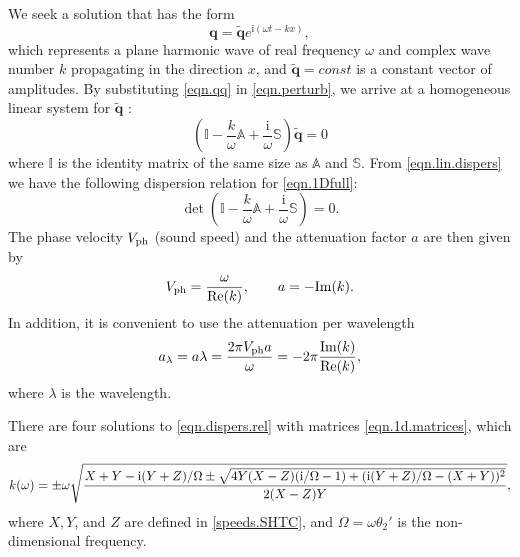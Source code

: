 \documentclass[3p,times,table]{article}
\newcommand{\qq}{{\bm{q}}}
\begin{document}
We seek a solution that has the form
\begin{equation}\label{eqn.qq}
\qq = \tilde{\qq} e^{\text{i}(\omega t - k x)},
\end{equation}
which represents a plane harmonic wave of real frequency $ \omega $ and complex wave number $ k $ 
propagating in the direction $ x $, and $ \tilde{\qq} = const $ is a constant 
vector of amplitudes. 
By substituting \eqref{eqn.qq} in \eqref{eqn.perturb}, we arrive at a homogeneous linear system for 
$ \tilde{\qq} $ \cite{Ruggeri1992,Ruggeri2015}:
\begin{equation}\label{eqn.lin.dispers}
\left(\mathbb{I} - \frac{k}{\omega} \mathbb{A} + \frac{\text{i}}{\omega} \mathbb{S} \right) 
\tilde{\qq} = 0
\end{equation}
where $ \mathbb{I} $ is the identity matrix of the same size as $ \mathbb{A} $ 
and $ \mathbb{S} $. From \eqref{eqn.lin.dispers} we have the following dispersion relation for 
\eqref{eqn.1Dfull}:
\begin{equation}\label{eqn.dispers.rel}
\det\left(\mathbb{I} - \frac{k}{\omega} \mathbb{A} + \frac{\text{i}}{\omega} \mathbb{S} \right) = 0.
\end{equation}
The phase velocity $ V_{\rm ph} $ (sound speed) and the attenuation factor $ a 
$ are then given by
\begin{equation}
V_{\rm ph} = \frac{\omega}{{\rm Re}(k)}, \qquad a = -{\rm Im}(k).
\end{equation}
In addition, it is convenient to use the attenuation per wavelength 
\cite{Ruggeri2015}
\begin{equation}\label{atten.wavelength}
a_\lambda = a \lambda = \frac{2 \pi V_{\rm ph} a }{\omega} = -2 \pi \frac{{\rm 
Im}(k)}{{\rm Re}(k)},
\end{equation}
where $ \lambda $ is the wavelength.

There are four solutions to \eqref{eqn.dispers.rel} with matrices 
\eqref{eqn.1d.matrices}, which are 
	\begin{equation}
	k(\omega) = \pm \omega \sqrt{\frac{X+Y - {\rm i}(Y+Z)/\Omega\pm \sqrt{4 Y 
	(X-Z)({\rm i}/\Omega-1) + 
	({\rm i}(Y+Z)/\Omega - (X + Y))^2}}{2(X-Z)Y}},
	\end{equation}
where $ X, Y $, and $ Z $ are defined in \eqref{speeds.SHTC}, and $ \Omega = 
\omega \theta_2' $ is the non-dimensional frequency.
\end{document}
